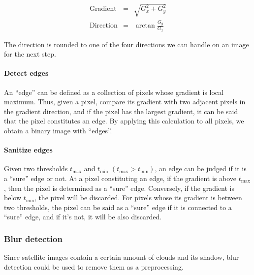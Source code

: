 \documentclass{article}
\begin{document}
                \begin{eqnarray*}
                    \mathrm{Gradient} &=& \sqrt{G_x^2 + G_y^2} \\
                    \mathrm{Direction} &=& \arctan{\frac{G_y}{G_x}}
                \end{eqnarray*}

                The direction is rounded to one of the four directions
                we can handle on an image for the next step.

            \paragraph{Detect edges}
                An ``edge'' can be defined as a collection of pixels
                whose gradient is local maximum.
                Thus, given a pixel, compare its gradient with two adjacent
                pixels in the gradient direction,
                and if the pixel has the largest gradient,
                it can be said that the pixel constitutes an edge.
                By applying this calculation to all pixels,
                we obtain a binary image with ``edges''.

            \paragraph{Sanitize edges}
                Given two thresholds $t_\mathrm{max}$ and $t_\mathrm{min}$
                $(t_\mathrm{max} > t_\mathrm{min})$,
                an edge can be judged if it is a ``sure'' edge or not.
                At a pixel constituting an edge,
                if the gradient is above $t_\mathrm{max}$,
                then the pixel is determined as a ``sure'' edge.
                Conversely, if the gradient is below $t_\mathrm{min}$,
                the pixel will be discarded.
                For pixels whose its gradient is between two thresholds,
                the pixel can be said as a ``sure'' edge if it is connected to
                a ``sure'' edge, and if it's not, it will be also discarded.

        \subsubsection{Blur detection}
            Since satellite images contain a certain amount of clouds and its shadow,
            blur detection could be used to remove them as a preprocessing.
\end{document}
